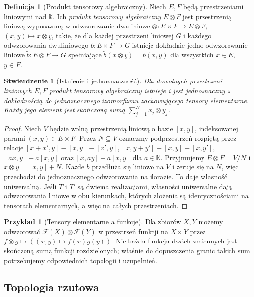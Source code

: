 \documentclass[11pt,a4paper]{article}
\numberwithin{equation}{section}
\theoremstyle{plain}
\newtheorem{stwierdzenie}[twierdzenie]{Stwierdzenie}
\theoremstyle{definition}
\newtheorem{definicja}[twierdzenie]{Definicja}
\newtheorem{przyklad}[twierdzenie]{Przykład}
\theoremstyle{remark}
\newcommand{\K}{\mathbb K}
\begin{document}
\begin{definicja}[Produkt tensorowy algebraiczny]
\label{def:alg-tensor24}
Niech $E,F$ będą przestrzeniami liniowymi nad $\K$.
Ich \emph{produkt tensorowy algebraiczny} $E\otimes F$ jest
przestrzenią liniową wyposażoną w odwzorowanie dwuliniowe
$\otimes:E\times F\to E\otimes F$, $ (x,y)\mapsto x\otimes y$,
takie, że dla każdej przestrzeni liniowej $G$ i każdego
odwzorowania dwuliniowego $b:E\times F\to G$ istnieje dokładnie
jedno odwzorowanie liniowe $\widetilde b:E\otimes F\to G$
spełniające $\widetilde b(x\otimes y)=b(x,y)$ dla wszystkich
$x\in E$, $y\in F$.
\end{definicja}

\begin{stwierdzenie}[Istnienie i jednoznaczność]
\label{prop:alg-existence24}
Dla dowolnych przestrzeni liniowych $E,F$ produkt tensorowy
algebraiczny istnieje i jest jednoznaczny z dokładnością do
jednoznacznego izomorfizmu zachowującego tensory elementarne.
Każdy jego element jest skończoną sumą $\sum_{j=1}^N x_j\otimes y_j$.
\end{stwierdzenie}
\begin{proof}
Niech $V$ będzie wolną przestrzenią liniową o bazie
$[x,y]$, indeksowanej parami $(x,y)\in E\times F$.
Przez $N\subseteq V$ oznaczmy podprzestrzeń rozpiętą przez
relacje $[x+x',y]-[x,y]-[x',y]$,
$[x,y+y']-[x,y]-[x,y']$, $[ax,y]-a[x,y]$
oraz $[x,ay]-a[x,y]$ dla $a\in\K$.
Przyjmujemy $E\otimes F=V/N$ i $x\otimes y=[x,y]+N$.
Każde $b$ przedłuża się liniowo na $V$ i zeruje się na $N$,
więc przechodzi do jednoznacznego odwzorowania na ilorazie.
To daje własność uniwersalną. Jeśli $T$ i $T'$ są dwiema
realizacjami, własności uniwersalne dają odwzorowania liniowe
w obu kierunkach, których złożenia są identycznościami na
tensorach elementarnych, a więc na całych przestrzeniach.
\end{proof}

\begin{przyklad}[Tensory elementarne a funkcje]
\label{ex:separable-functions24}
Dla zbiorów $X,Y$ możemy odwzorować
$\mathcal F(X)\otimes\mathcal F(Y)$ w przestrzeń funkcji na
$X\times Y$ przez $f\otimes g\mapsto ((x,y)\mapsto f(x)g(y))$.
Nie każda funkcja dwóch zmiennych jest skończoną sumą funkcji
rozdzielonych; właśnie do dopuszczenia granic takich sum
potrzebujemy odpowiednich topologii i uzupełnień.
\end{przyklad}

\subsection{Topologia rzutowa}
\end{document}
